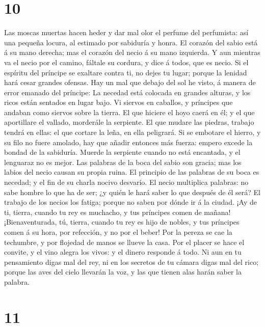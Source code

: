 \hypertarget{section-9}{%
\section{10}\label{section-9}}

 Las moscas muertas hacen heder y dar mal olor el perfume
del perfumista: así una pequeña locura, al estimado por sabiduría y
honra.  El corazón del sabio está á su mano derecha; mas el
corazón del necio á su mano izquierda.  Y aun mientras va el
necio por el camino, fáltale su cordura, y dice á todos, que es necio.
 Si el espíritu del príncipe se exaltare contra ti, no dejes
tu lugar; porque la lenidad hará cesar grandes ofensas.  Hay
un mal que debajo del sol he visto, á manera de error emanado del
príncipe:  La necedad está colocada en grandes alturas, y
los ricos están sentados en lugar bajo.  Vi siervos en
caballos, y príncipes que andaban como siervos sobre la tierra.
 El que hiciere el hoyo caerá en él; y el que aportillare el
vallado, morderále la serpiente.  El que mudare las piedras,
trabajo tendrá en ellas: el que cortare la leña, en ella peligrará.
 Si se embotare el hierro, y su filo no fuere amolado, hay
que añadir entonces más fuerza: empero excede la bondad de la sabiduría.
 Muerde la serpiente cuando no está encantada, y el
lenguaraz no es mejor.  Las palabras de la boca del sabio
son gracia; mas los labios del necio causan su propia ruina.
 El principio de las palabras de su boca es necedad; y el
fin de su charla nocivo desvarío.  El necio multiplica
palabras: no sabe hombre lo que ha de ser; ¿y quién le hará saber lo que
después de él será?  El trabajo de los necios los fatiga;
porque no saben por dónde ir á la ciudad.  ¡Ay de ti,
tierra, cuando tu rey es muchacho, y tus príncipes comen de mañana!
 ¡Bienaventurada, tú, tierra, cuando tu rey es hijo de
nobles, y tus príncipes comen á su hora, por refección, y no por el
beber!  Por la pereza se cae la techumbre, y por flojedad
de manos se llueve la casa.  Por el placer se hace el
convite, y el vino alegra los vivos: y el dinero responde á todo.
 Ni aun en tu pensamiento digas mal del rey, ni en los
secretos de tu cámara digas mal del rico; porque las aves del cielo
llevarán la voz, y las que tienen alas harán saber la palabra.

\hypertarget{section-10}{%
\section{11}\label{section-10}}

